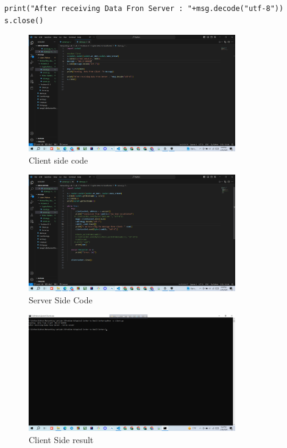 \documentclass[11pt]{article}
\begin{document}
\begin{itemize}
\begin{verbatim}
print("After receiving Data Fron Server : "+msg.decode("utf-8"))
s.close()
\end{verbatim}
    \begin{figure}[H]
        \centering
        \includegraphics[width=0.8\textwidth]{small.client.png}
        \caption{Client side code}
        \label{fig:1}
    \end{figure}
    
    \begin{figure}[H]
        \centering
        \includegraphics[width=0.8\textwidth]{small.server.png}
        \caption{Server Side Code}
        \label{fig:2}
    \end{figure}
    
    \begin{figure}[H]
      \centering
      \includegraphics[width=0.8\textwidth]{small_result.client.png}
      \caption{Client Side result}
      \label{fig:3}
    \end{figure}
    

\end{itemize}
\end{document}

